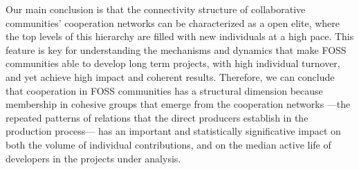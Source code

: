 Our main conclusion is that the connectivity structure of collaborative communities' cooperation networks can be characterized as a open elite, where the top levels of this hierarchy are filled with new individuals at a high pace. This feature is key for understanding the mechanisms and dynamics that make FOSS communities able to develop long term projects, with high individual turnover, and yet achieve high impact and coherent results. Therefore, we can conclude that cooperation in FOSS communities has a structural dimension because membership in cohesive groups that emerge from the cooperation networks ---the repeated patterns of relations that the direct producers establish in the production process--- has an important and statistically significative impact on both the volume of individual contributions, and on the median active life of developers in the projects under analysis.
